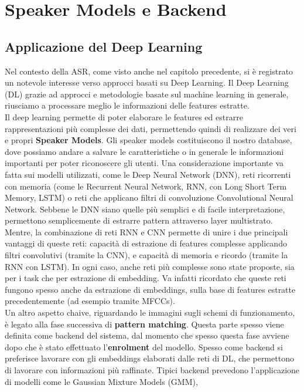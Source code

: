 \chapter{Speaker Models e Backend}
\label{ch:speakermodels}

\section{Applicazione del Deep Learning}
Nel contesto della ASR, come visto anche nel capitolo precedente, si è registrato un notevole interesse verso approcci basati su Deep Learning. 
Il Deep Learning (DL) grazie ad approcci e metodologie basate sul machine learning in generale, riusciamo a processare meglio le informazioni 
delle features estratte. \\
Il deep learning \cite{tirumala2016review} permette di poter elaborare le features ed estrarre rappresentazioni più complesse dei dati, permettendo quindi di realizzare dei
veri e propri \textbf{Speaker Models}. Gli speaker models costituiscono il nostro database, dove possiamo andare a salvare le caratteristiche o 
in generale le informazioni importanti per poter riconoscere gli utenti. Una considerazione importante va fatta sui modelli utilizzati, come le Deep Neural Network (DNN),
reti ricorrenti con memoria (come le Recurrent Neural Network, RNN, con Long Short Term Memory, LSTM) o reti che applicano filtri di convoluzione Convolutional Neural Network.
Sebbene le DNN siano quelle più semplici e di facile interpretazione, permettono semplicemente di estrarre pattern attraverso layer multistrato. Mentre, la combinazione
di reti RNN e CNN permette di unire i due principali vantaggi di queste reti: capacità di estrazione di features complesse applicando filtri convolutivi (tramite la CNN),
e capacità di memoria e ricordo (tramite la RNN con LSTM). In ogni caso, anche reti più complesse sono state proposte, sia per i task che per estrazione di embedding. 
Va infatti ricordato che queste reti fungono spesso anche da estrazione di embeddings, sulla base di features estratte precedentemente (ad esempio tramite MFCCs). \\
Un altro aspetto chaive, riguardando le immagini sugli schemi di funzionamento, è legato alla fase successiva di \textbf{pattern matching}. Questa parte spesso viene definita come
backend del sistema, dal momento che spesso questa fase avviene dopo che è stato effettuato l'\textbf{enrolment} del modello. Spesso come backend si preferisce lavorare con gli embeddings 
elaborati dalle reti di DL, che permettono di lavorare con informazioni più raffinate. Tipici backend prevedono l'applicazione di modelli come le Gaussian Mixture Models (GMM),
